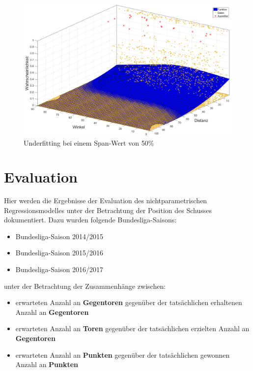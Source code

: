 \begin{figure}[H]
\centering
\includegraphics[scale=0.34]{se-wa-jpg/splinewdTL}
\caption{Underfitting bei einem Span-Wert von 50\%}
\label{splinewdTL}
\end{figure}

\chapter{Evaluation}
\label{anheva}

Hier werden die Ergebnisse der Evaluation des nichtparametrischen Regressionsmodelles unter der Betrachtung der Position des Schusses dokumentiert. Dazu wurden folgende Bundesliga-Saisons:

\begin{itemize}
\item Bundesliga-Saison 2014/2015 
\item Bundesliga-Saison 2015/2016 
\item Bundesliga-Saison 2016/2017 
\end{itemize}

unter der Betrachtung der Zusammenhänge zwischen:

\begin{itemize}
\item erwarteten Anzahl an \textbf{Gegentoren} gegenüber der tatsächlichen erhaltenen Anzahl an \textbf{Gegentoren}
\item erwarteten Anzahl an \textbf{Toren} gegenüber der tatsächlichen erzielten Anzahl an \textbf{Gegentoren}
\item erwarteten Anzahl an \textbf{Punkten} gegenüber der tatsächlichen gewonnen Anzahl an \textbf{Punkten}
\end{itemize}

